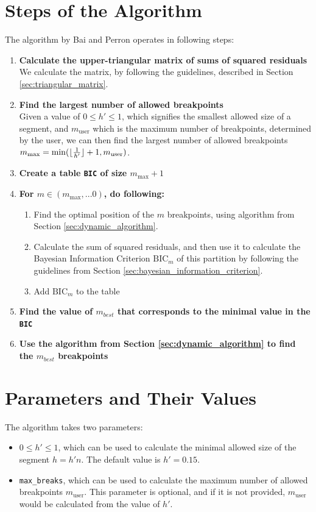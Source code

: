 \documentclass[main.tex]{subfiles}
\begin{document}
\section{Steps of the Algorithm}
\label{sec:steps_of_the_algorithm}
The algorithm by Bai and Perron operates in following steps:
\begin{enumerate}
\item \textbf{Calculate the upper-triangular matrix of sums of squared residuals}\\
  We calculate the matrix, by following the guidelines, described in Section \ref{sec:triangular_matrix}.
\item \textbf{Find the largest number of allowed breakpoints}\\
  Given a value of $0\leq h' \leq 1$, which signifies the smallest allowed size of
  a segment, and $m_{\text{user}}$ which is the maximum number of breakpoints, determined by the user, 
  we can then find the largest number of allowed
  breakpoints $m_{\text{max}} = \min(\lfloor\frac{1}{h'}\rfloor + 1, m_{\text{user}})$.
\item \textbf{Create a table \texttt{BIC} of size $m_{\text{max}} + 1$}
\item \textbf{For $m \in (m_{\text{max}}, ... 0)$, do following:}
  \begin{enumerate}[1)]
  \item Find the optimal position of the $m$ breakpoints, using algorithm
    from Section \ref{sec:dynamic_algorithm}.
  \item Calculate the sum of squared residuals, and then use it to
    calculate the Bayesian Information Criterion $\text{BIC}_m$ of this
    partition by following the guidelines from Section
    \ref{sec:bayesian_information_criterion}.
  \item Add $\text{BIC}_m$ to the table
  \end{enumerate}
\item \textbf{Find the value of $m_{best}$ that corresponds to the minimal value in the \texttt{BIC}}
\item \textbf{Use the algorithm from Section \ref{sec:dynamic_algorithm} to find the $m_{best}$ breakpoints}
\end{enumerate}

\section{Parameters and Their Values}
\label{sec:breakpoints_params}
The algorithm takes two parameters:
\begin{itemize}
\item  $0\leq h' \leq 1$, which can be used to calculate the minimal allowed size of the segment
  $h = h' n$. The default value is $h' = 0.15$.
\item \texttt{max\_breaks}, which can be used to calculate the maximum number of allowed breakpoints
  $m_{\text{user}}$. This parameter is optional, and if it is not provided, $m_{\text{user}}$ would be calculated
  from the value of $h'$.
\end{itemize}



\biblio
\end{document}
